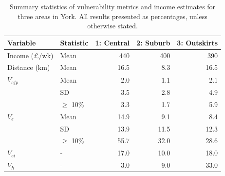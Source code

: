 \documentclass[a4paper, 11pt, twoside]{Thesis}
\begin{document}
\begin{table}[htbp]
\caption[Summary statistics of vulnerability metrics]{Summary statistics of
vulnerability metrics and income
estimates for three areas in York. All results presented as
percentages, unless otherwise stated.}
\begin{center}
\begin{tabular}{|l|l|r|r|r|}
\hline
Variable & Statistic & \multicolumn{1}{l|}{1: Central} &
\multicolumn{1}{l|}{2: Suburb} & \multicolumn{1}{l|}{3: Outskirts} \\ \hline
\multicolumn{ 1}{|l|}{Income (\pounds/wk)} & Mean & 440 & 400 & 390 \\ \hline
\multicolumn{ 1}{|l|}{Distance (km)} & Mean & 16.5 & 8.3 & 16.5 \\ \hline
\multicolumn{ 1}{|l|}{$V_{cfp}$} & Mean & 2.0 & 1.1 & 2.1 \\
\multicolumn{ 1}{|l|}{} & SD & 3.5 & 2.8 & 4.9 \\
\multicolumn{ 1}{|l|}{} & $\geq$ 10\% & 3.3 & 1.7 & 5.9 \\ \hline
\multicolumn{ 1}{|l|}{$V_e$} & Mean & 14.9 & 9.1 & 8.4 \\
\multicolumn{ 1}{|l|}{} & SD & 13.9 & 11.5 & 12.3 \\
\multicolumn{ 1}{|l|}{} & $\geq$ 10\% & 55.7 & 32.0 & 28.6 \\ \hline
$V_{ei}$ & - & 17.0 & 10.0 & 18.0 \\ \hline
$V_h$ & - & 3.0 & 9.0 & 33.0 \\ \hline
\end{tabular}\end{center}
\label{t:ind}
\end{table}
\end{document}
